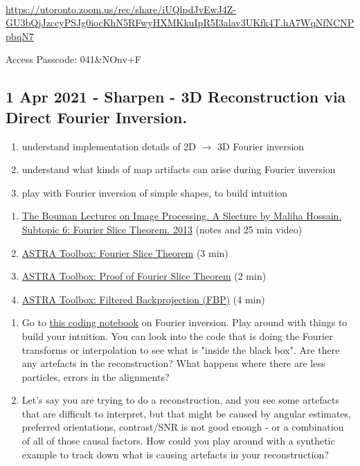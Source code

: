 \documentclass[11pt, oneside]{article}   	%
\begin{document}
 \\
{\tiny \url{https://utoronto.zoom.us/rec/share/iUQlpdJvEwJ4Z-GU3bQjJzccyPSJg0iocKhN5RFwyHXMKkuIpR5I3alav3UKfk4T.hA7WqNfNCNPpbqN7}}

Access Passcode: 041\&NOnv+F

\subsection{1 Apr 2021 - Sharpen - 3D Reconstruction via Direct Fourier Inversion.}

\begin{enumerate}
  \item understand implementation details of 2D $\rightarrow$ 3D Fourier inversion
  \item understand what kinds of map artifacts can arise during Fourier inversion
  \item play with Fourier inversion of simple shapes, to build intuition
\end{enumerate}
\begin{enumerate}
	\item \href{https://www.projectrhea.org/rhea/index.php/ECE637_tomographic_reconstruction_fourier_slice_theorem_S13_mhossain}{The Bouman Lectures on Image Processing. A Slecture by Maliha Hossain. Subtopic 6: Fourier Slice Theorem. 2013} (notes and 25 min video)
 	\item \href{https://youtu.be/YIvTpW3IevI}{ASTRA Toolbox: Fourier Slice Theorem} (3 min)
	\item \href{https://youtu.be/DcmL1JGoiPs}{ASTRA Toolbox: Proof of Fourier Slice Theorem} (2 min)
	\item \href{https://youtu.be/pZ7JlXagT0w}{ASTRA Toolbox: Filtered Backprojection (FBP)} (4 min)
\end{enumerate}
\begin{enumerate}
	\item Go to \href{https://github.com/geoffwoollard/learn_cryoem_math/blob/master/nb/fourier_slice_2D_3D_with_trilinear.ipynb}{this coding notebook} on Fourier inversion. Play around with things to build your intuition. You can look into the code that is doing the Fourier transforms or interpolation to see what is "inside the black box". Are there any artefacts in the reconstruction? What happens where there are less particles, errors in the alignments?
	\item Let's say you are trying to do a reconstruction, and you see some artefacts that are difficult to interpret, but that might be caused by angular estimates, preferred orientations, contrast/SNR is not good enough - or a combination of all of those causal factors. How could you play around with a synthetic example to track down what is causing artefacts in your reconstruction?
\end{enumerate}
\end{document}

